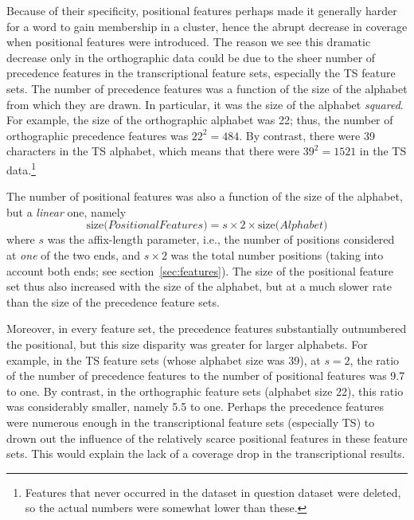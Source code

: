 {Because of their specificity, positional features perhaps made it generally harder for a word to gain membership in a cluster, hence the abrupt decrease in coverage when positional features were introduced. The reason we see this dramatic decrease only in the orthographic data could be due to the sheer number of precedence features in the transcriptional feature sets, especially the TS feature sets. 
The number of precedence features was a function of the size of the alphabet from which they are drawn. 
%
In particular, it was the size of the alphabet \emph{squared}. For example, the size of the orthographic alphabet was 22; thus, the number of orthographic precedence features was $22^2 = 484$. By contrast, there were 39 characters in the TS alphabet, which means that there were $39^2 = 1521$ in the TS data.\footnote{Features that never occurred in the dataset in question dataset were deleted, so the actual numbers were somewhat lower than these.}

The number of positional features was also a function of the size of the alphabet, but a \emph{linear} one, namely 
\begin{equation*}
\text{size(}{PositionalFeatures}\text{)} = s \times 2 \times \text{size(}{Alphabet}\text{)}
\end{equation*}
where $s$ was the affix-length parameter, i.e., the number of positions considered at \emph{one} of the two ends, and $s \times 2$ was the total number positions (taking into account both ends; see section~\ref{sec:features}). The size of the positional feature set thus also increased with the size of the alphabet, but at a much slower rate than the size of the precedence feature sets.

Moreover, in every feature set, the precedence features substantially outnumbered the positional, but this size disparity was greater for larger alphabets.
For example, in the TS feature sets (whose alphabet size was 39), at $s =2$, the ratio of the number of precedence features to the number of positional features was 9.7 to one. By contrast, in the orthographic feature sets (alphabet size 22), this ratio was considerably smaller, namely 5.5 to one.
Perhaps the precedence features were numerous enough in the transcriptional feature sets (especially TS) to drown out the influence of the relatively scarce positional features in these feature sets. This would explain the lack of a coverage drop in the transcriptional results.

}
